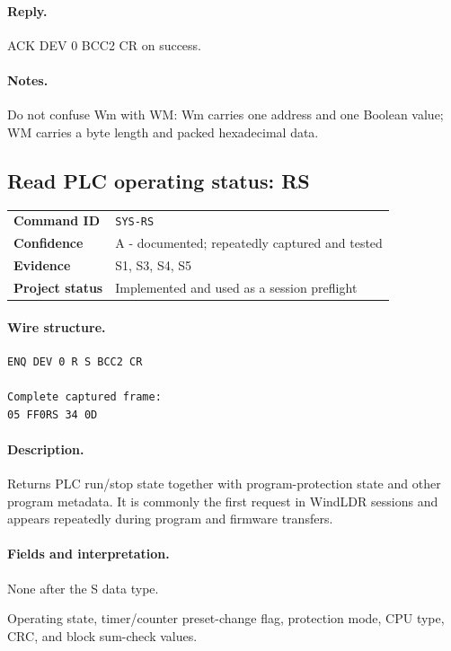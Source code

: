 \documentclass[10pt,letterpaper]{article}
\begin{document}
\paragraph{Reply.} ACK DEV 0 BCC2 CR on success.
\paragraph{Notes.} Do not confuse Wm with WM: Wm carries one address and one Boolean value; WM carries a byte length and packed hexadecimal data.

\subsection{Read PLC operating status: RS}
\begin{tabularx}{\textwidth}{@{}>{\bfseries}p{2.8cm}X@{}}
Command ID & \texttt{SYS-RS} \\
Confidence & A - documented; repeatedly captured and tested \\
Evidence & S1, S3, S4, S5 \\
Project status & Implemented and used as a session preflight \\
\end{tabularx}
\vspace{0.35em}
\paragraph{Wire structure.}
\begin{Verbatim}[breaklines=true,breakanywhere=true,fontsize=\small]
ENQ DEV 0 R S BCC2 CR

Complete captured frame:
05 FF0RS 34 0D
\end{Verbatim}
\paragraph{Description.} Returns PLC run/stop state together with program-protection state and other program metadata. It is commonly the first request in WindLDR sessions and appears repeatedly during program and firmware transfers.
\paragraph{Fields and interpretation.}
\begin{description}[style=nextline,leftmargin=3.2cm,labelwidth=3.0cm,font=\normalfont\bfseries]
\item[Request payload] None after the S data type.
\item[Documented reply data] Operating state, timer/counter preset-change flag, protection mode, CPU type, CRC, and block sum-check values.
\end{description}
\end{document}
